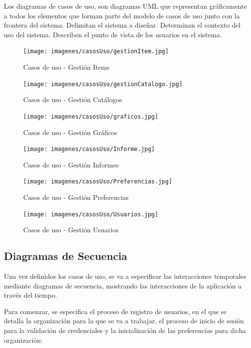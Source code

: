 \documentclass[a4paper,11pt]{book}
\begin{document}
Los diagramas de casos de uso, son diagramas UML que representan gráficamente a todos los elementos que forman parte del modelo de casos de uso junto con la frontera del sistema. Delimitan el sistema a diseñar. Determinan el contexto del uso del sistema. Describen el punto de vista de los usuarios  en el sistema.

\begin{figure}[htbp]  
\centering 
\texttt{[image: imagenes/casosUso/gestionItem.jpg]}
\caption{ Casos de uso - Gestión Items\cite{diagrama}  }  
\end{figure}

\begin{figure}[H] 
\centering 
\texttt{[image: imagenes/casosUso/gestionCatalogo.jpg]}
\caption{ Casos de uso - Gestión Catálogos\cite{diagrama}  }  
\end{figure}

\begin{figure}[H] 
\centering 
\texttt{[image: imagenes/casosUso/graficos.jpg]}
\caption{ Casos de uso - Gestión Gráficos\cite{diagrama}  }  
\end{figure}


\begin{figure}[H] 
\centering 
\texttt{[image: imagenes/casosUso/Informe.jpg]}
\caption{ Casos de uso - Gestión Informes\cite{diagrama}  }  
\end{figure}

\begin{figure}[H] 
\centering 
\texttt{[image: imagenes/casosUso/Preferencias.jpg]}
\caption{ Casos de uso - Gestión Preferencias\cite{diagrama}  }  
\end{figure}

\begin{figure}[H] 
\centering 
\texttt{[image: imagenes/casosUso/Usuarios.jpg]}
\caption{ Casos de uso - Gestión Usuarios\cite{diagrama}  }  
\end{figure}

\subsection{Diagramas de Secuencia}
Una vez definidos los casos de uso, se va a especificar las interacciones temporales mediante diagramas de secuencia, mostrando las interacciones de la aplicación a través del tiempo. 

Para comenzar, se especifica el proceso de registro de usuarios, en el que se detalla la organización para la que se va a trabajar, el proceso de inicio de sesión para la validación de credenciales y la inicialización de las preferencias para dicha organización:
\end{document}
